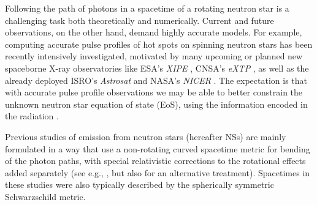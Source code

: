 \documentclass{aa}
\newcommand{\refe}[1]{#1}
\newcommand{\refedel}[1]{}
\newcommand{\sch}{Schwarzschild }
\begin{document}
\refe{Following the path of photons in a spacetime of a rotating neutron star is a challenging task both theoretically and numerically.}
Current and future observations, on the other hand, demand highly accurate models.
For example, computing accurate pulse profiles of hot spots on spinning neutron stars has been recently intensively investigated, motivated by many upcoming or planned new spaceborne X-ray observatories like ESA's \textit{XIPE} \citep{XIPE}, CNSA's \textit{eXTP} \citep{eXTP}, as well as the already deployed ISRO's \textit{Astrosat} \citep{Astrosat} \refe{and NASA's \textit{NICER} \citep{NICER}.}
The expectation is that with accurate pulse profile observations we may be able to better constrain the unknown neutron star equation of state (EoS), using the information encoded in the radiation \citep[see e.g.,][]{LMB13}.

Previous studies of emission from neutron stars (hereafter NSs) are mainly formulated in a way that use a non-rotating curved spacetime metric for bending of the photon paths, with special relativistic corrections to the rotational effects added separately\refedel{, in an ad-hoc manner} (see e.g.,\refe{ \citealt{PFC83,P95, ML98, WM01, PG03, PB06, Lamb09a, Lamb09b, LMB13, ML15}, but also \citealt{BR01} for \refe{an alternative} treatment). } 
Spacetimes in these studies were also typically described by the spherically symmetric \sch metric.
\end{document}
